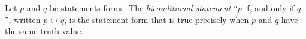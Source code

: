 \guard



\begin{defn}
\label{defs:biconditional}
  Let $p$ and $q$ be statements forms.
  The \emph{biconditional statement} ``$p$ if, and only if $q$'', written $p \leftrightarrow q$, is the statement form that is true precisely when $p$ and $q$ have the same truth value.
\end{defn}
